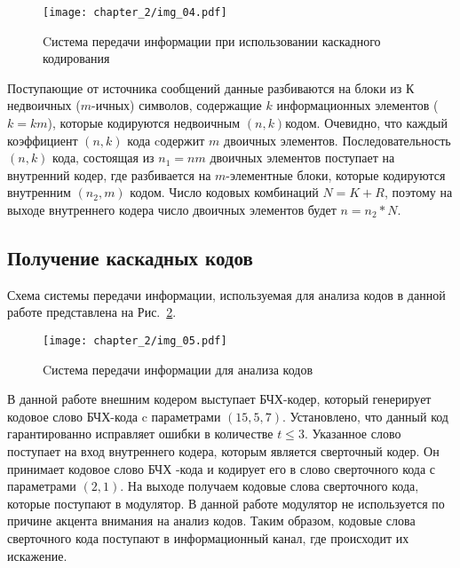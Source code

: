 \begin{figure}[htbp]
\begin{center}
\texttt{[image: chapter\_2/img\_04.pdf]}
\end{center}
\caption{Cистема передачи информации при использовании каскадного кодирования}
\label{img_04}
\end{figure}

Поступающие от источника сообщений данные разбиваются на блоки из $К$ недвоичных ($m$-ичных) символов, 
содержащие $k$ информационных элементов ($k=km$), которые кодируются недвоичным $(n, k)$кодом. Очевидно, что 
каждый коэффициент $(n, k )$ кода cодержит $m$ двоичных элементов. Последовательность $(n, k)$ кода, 
состоящая из $n_1=nm$ двоичных элементов поступает на внутренний кодер, где разбивается на $m$-элементные 
блоки, которые кодируются внутренним $(n_2, m)$ кодом. Число кодовых комбинаций $N=K+R$, поэтому на выходе 
внутреннего кодера число двоичных элементов будет $n=n_2*N$.

\subsection{Получение каскадных кодов}
Схема системы передачи информации, используемая для анализа кодов в данной работе представлена на
Рис.~\ref{img_05}.

\begin{figure}[htbp]
\begin{center}
\texttt{[image: chapter\_2/img\_05.pdf]}
\end{center}
\caption{Cистема передачи информации для анализа кодов}
\label{img_05}
\end{figure}

В данной работе внешним кодером выступает БЧХ-кодер, который генерирует кодовое слово БЧХ-кода c параметрами 
$(15, 5, 7 )$. Установлено, что данный код гарантированно исправляет ошибки в количестве $t\le3$. Указанное 
слово поступает на вход внутреннего кодера, которым является сверточный кодер. Он принимает кодовое слово БЧХ
-кода и кодирует его в слово сверточного кода с параметрами $(2, 1)$. На выходе получаем кодовые слова 
сверточного кода, которые поступают в модулятор. В данной работе модулятор не используется по причине 
акцента внимания на анализ кодов. Таким образом, кодовые слова сверточного кода поступают в информационный 
канал, где происходит их искажение.

